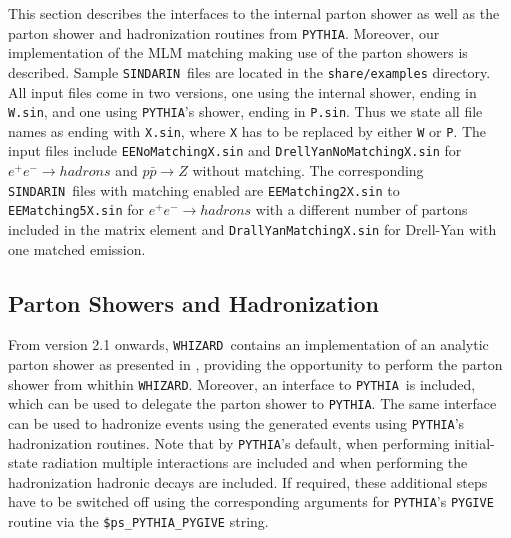 \documentclass[12pt]{book}
\newcommand{\ttt}[1]{\texttt{#1}}
\newcommand{\whizard}{\ttt{WHIZARD}}
\newcommand{\pythia}{\ttt{PYTHIA}}
\newcommand{\sindarin}{\ttt{SINDARIN}}
\begin{document}
This section describes the interfaces to the internal parton shower as
well as the parton shower and hadronization routines from
\pythia. Moreover, our implementation of the MLM matching making use
of the parton showers is described. Sample \sindarin\ files are
located in the \ttt{share/examples} directory.
All input files come in two versions, one using the internal shower,
ending in \ttt{W.sin}, and one using \pythia's shower, ending in
\ttt{P.sin}. Thus we state all file names as ending with \ttt{X.sin},
where \ttt{X} has to be replaced by either \ttt{W} or \ttt{P}.
The input files include \ttt{EENoMatchingX.sin} and
\ttt{DrellYanNoMatchingX.sin} for $e^+ e^- \to hadrons$ and $p\bar{p}
\to Z$ without matching. The corresponding \sindarin\ files with
matching enabled are \ttt{EEMatching2X.sin} to \ttt{EEMatching5X.sin}
for $e^+ e^- \to hadrons$ with a different number of partons included
in the matrix element and \ttt{DrallYanMatchingX.sin} for Drell-Yan
with one matched emission.

\subsection{Parton Showers and Hadronization}

From version 2.1 onwards, \whizard\ contains an implementation of an
analytic parton shower as presented in \cite{Kilian:2011ka}, providing
the opportunity to perform the parton shower from whithin
\whizard. Moreover, an interface to \pythia\ is included, which can be
used to delegate the parton shower to \pythia. The same interface can
be used to hadronize events using the generated events using \pythia's
hadronization routines. Note that by \pythia's default, when
performing initial-state radiation multiple interactions are included
and when performing the hadronization hadronic decays are included. If
required, these additional steps have to be switched off using the
corresponding arguments for \pythia's \ttt{PYGIVE} routine via the
\ttt{\$ps\_PYTHIA\_PYGIVE} string.
\end{document}

